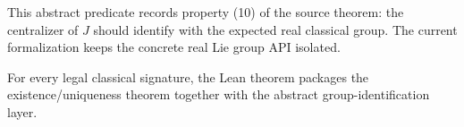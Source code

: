 \begin{definition}
  \label{def:has_expected_group_identification}
  \leanok
  This abstract predicate records property (10) of the source theorem: the
  centralizer of \(J\) should identify with the expected real classical group.
  The current formalization keeps the concrete real Lie group API isolated.
\end{definition}

\begin{theorem}
  \label{thm:classical_group_theorem}
  \leanok
  For every legal classical signature, the Lean theorem packages the
  existence/uniqueness theorem together with the abstract group-identification
  layer.
\end{theorem}
